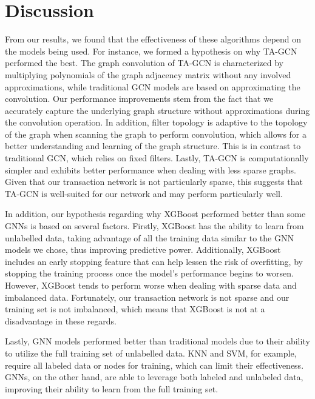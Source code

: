 \documentclass{article}
\begin{document}
\section{Discussion}
    From our results, we found that the effectiveness of these algorithms depend on the models being used. For instance, we formed a hypothesis on why TA-GCN performed the best. The graph convolution of TA-GCN is characterized by multiplying polynomials of the graph adjacency matrix without any involved approximations, while traditional GCN models are based on approximating the convolution. Our performance improvements stem from the fact that we accurately capture the underlying graph structure without approximations during the convolution operation. In addition, filter topology is adaptive to the topology of the graph when scanning the graph to perform convolution, which allows for a better understanding and learning of the graph structure. This is in contrast to traditional GCN, which relies on fixed filters. Lastly, TA-GCN is computationally simpler and exhibits better performance when dealing with less sparse graphs. Given that our transaction network is not particularly sparse, this suggests that TA-GCN is well-suited for our network and may perform particularly well. 

    In addition, our hypothesis regarding why XGBoost performed better than some GNNs is based on several factors. Firstly, XGBoost has the ability to learn from unlabelled data, taking advantage of all the training data similar to the GNN models we chose, thus improving predictive power. Additionally, XGBoost includes an early stopping feature that can help lessen the risk of overfitting, by stopping the training process once the model’s performance begins to worsen. However, XGBoost tends to perform worse when dealing with sparse data and imbalanced data. Fortunately, our transaction network is not sparse and our training set is not imbalanced, which means that XGBoost is not at a disadvantage in these regards. 

    Lastly, GNN models performed better than traditional models due to their ability to utilize the full training set of unlabelled data. KNN and SVM, for example, require all labeled data or nodes for training, which can limit their effectiveness. GNNs, on the other hand, are able to leverage both labeled and unlabeled data, improving their ability to learn from the full training set.
    
\end{document}
